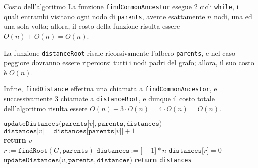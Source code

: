 \documentclass[a4paper, 12pt]{report}
\begin{document}
    \begin{framedobs}{Costo dell'algoritmo}
        La funzione \texttt{findCommonAncestor} esegue 2 cicli \texttt{while}, i quali entrambi visitano ogni nodo di \texttt{parents}, avente esattamente $n$ nodi, una ed una sola volta; allora, il costo della funzione risulta essere $O(n) + O(n) = O(n)$.

        La funzione \texttt{distanceRoot} risale ricorsivamente l'albero \texttt{parents}, e nel caso peggiore dovranno essere ripercorsi tutti i nodi padri del grafo; allora, il suo costo è $O(n)$.

        Infine, \texttt{findDistance} effettua una chiamata a \texttt{findCommonAncestor}, e successivamente 3 chiamate a \texttt{distanceRoot}, e dunque il costo totale dell'algoritmo risulta essere $O(n) + 3 \cdot O(n) = 4 \cdot O(n) = O(n)$.
    \end{framedobs}

    \begin{algorithm}[H]
        \caption{
            Dato un grafo $G$, rappresentato attraverso liste di adiacenza, e un vettore di padri di un albero/arborescenza di visita in DFS di $G$, l'algoritmo restituisce la distanza di ogni vertice dalla radice dell'albero/arborescenza.\\
            \textbf{Input}: $G$ grafo diretto, rappresentato attraverso liste di adiacenza; \texttt{parents} un array di padri di un albero/arborescenza radicato in un certo $r \in V(G)$.\\
            \textbf{Output}: $\forall v \in V(G) \quad \mathrm{dist}(r, v)$.
        }

        \begin{algorithmic}[1]
                 
                    \State $\texttt{updateDistances(parents[}v\texttt{]}, \texttt{parents}, \texttt{distances)}$
                \EndIf
                \State $\texttt{distances[}v\texttt{]} = \texttt{distances[parents[}v\texttt{]]} + 1$
            \EndFunction
            \\
                        \State \textbf{return} $v$
                    \EndIf
                \EndFor
            \EndFunction
            \\
                \State $r := \texttt{findRoot}(G, \texttt{parents})$
                \State $\texttt{distances}:=\texttt{[}-1\texttt{]} * n$
                \State $\texttt{distances[}r\texttt{]} = 0$
                     
                        \State $\texttt{updateDistances(}v, \texttt{parents}, \texttt{distances)}$
                    \EndIf
                \EndFor
                \State \textbf{return} \texttt{distances}
            \EndFunction
        \end{algorithmic}
    \end{algorithm}
\end{document}
